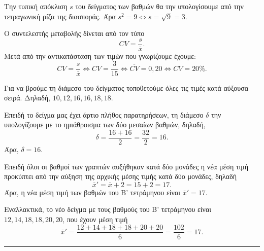 
\begin{alist}
    \item Την τυπική απόκλιση $s$ του δείγματος των βαθμών θα την υπολογίσουμε από την τετραγωνική ρίζα της διασποράς. Άρα $s^2 = 9 \Leftrightarrow s = \sqrt{9} = 3$.

    Ο συντελεστής μεταβολής δίνεται από τον τύπο
    \[
        CV = \frac{s}{\bar{x}}.
    \]
    Μετά από την αντικατάσταση των τιμών που γνωρίζουμε έχουμε:
    \[
        CV = \frac{s}{\bar{x}} \Leftrightarrow CV = \frac{3}{15} \Leftrightarrow \overline{CV} = 0,20 \Leftrightarrow CV = 20\%.
    \]

    \item Για να βρούμε τη διάμεσο του δείγματος τοποθετούμε όλες τις τιμές κατά αύξουσα σειρά. Δηλαδή, $10,12,16,16,18,18$.

    Επειδή το δείγμα μας έχει άρτιο πλήθος παρατηρήσεων, τη διάμεσο $\delta$ την υπολογίζουμε με το ημιάθροισμα των δύο μεσαίων βαθμών, δηλαδή,
    \[
        \delta = \frac{16+16}{2} = \frac{32}{2} = 16.
    \]
    Άρα, $\delta=16$.

    \item Επειδή όλοι οι βαθμοί των γραπτών αυξήθηκαν κατά δύο μονάδες η νέα μέση τιμή προκύπτει από την αύξηση της αρχικής μέσης τιμής κατά δύο μονάδες, δηλαδή
    \[
        \bar{x}' = \bar{x} + 2 = 15 + 2 = 17.
    \]
    Άρα, η νέα μέση τιμή των βαθμών του Β' τετράμηνου είναι $\bar{x}' = 17$.

    Εναλλακτικά, το νέο δείγμα με τους βαθμούς του Β' τετράμηνου είναι $12, 14, 18, 18, 20, 20$, που έχουν μέση τιμή
    \[
        \bar{x}' = \frac{12 + 14 + 18 + 18 + 20 + 20}{6} = \frac{102}{6} = 17.
    \]
\end{alist}
\vspace{6mm}
\noindent\rule{\textwidth}{0.4pt}
\vspace{6mm}

